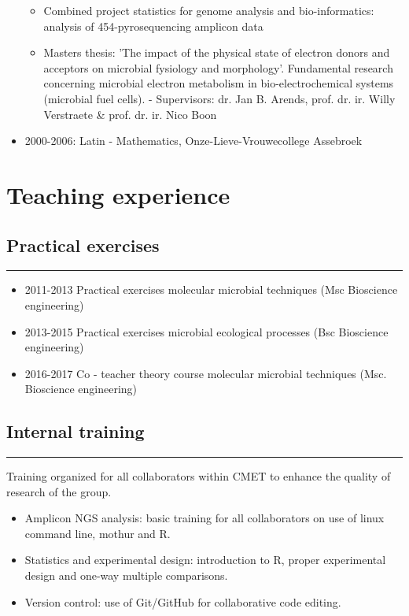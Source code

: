 \documentclass[a4paper,11pt,oneside]{article}
\begin{document}
\begin{itemize}
\begin{itemize}
		\item Combined project statistics for genome analysis and bio-informatics: analysis of 454-pyrosequencing amplicon data
		\item Masters thesis: 'The impact of the physical state of electron donors and acceptors on microbial fysiology and morphology'. Fundamental research concerning microbial electron metabolism in bio-electrochemical systems (microbial fuel cells). - Supervisors: dr. Jan B. Arends, prof. dr. ir. Willy Verstraete \& prof. dr. ir. Nico Boon
	\end{itemize}
\item 2000-2006: Latin - Mathematics, Onze-Lieve-Vrouwecollege Assebroek
\end{itemize}



\section*{Teaching experience}
\subsection*{Practical exercises}
\rule{\textwidth}{1pt}
\begin{itemize}
  \item 2011-2013 Practical exercises molecular microbial techniques (Msc Bioscience engineering)
  \item 2013-2015 Practical exercises microbial ecological processes (Bsc Bioscience engineering)
  \item 2016-2017 Co - teacher theory course molecular microbial techniques (Msc. Bioscience engineering) 
\end{itemize}
\subsection*{Internal training}
\rule{\textwidth}{1pt}
Training organized for all collaborators within CMET to enhance the quality of research of the group.
\begin{itemize}
  \item Amplicon NGS analysis: basic training for all collaborators on use of linux command line, mothur and R.
  \item Statistics and experimental design: introduction to R, proper experimental design and one-way multiple comparisons.
  \item Version control: use of Git/GitHub for collaborative code editing.
\end{itemize}
\end{document}
